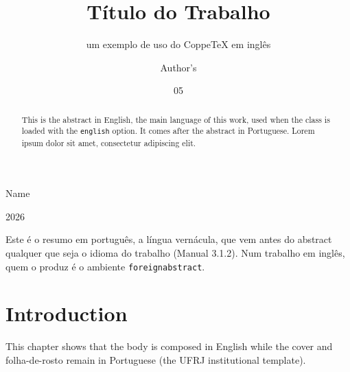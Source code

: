 \documentclass[english,dsc]{ufrj}
\begin{document}
  \title{Título do Trabalho}
  \subtitle{um exemplo de uso do CoppeTeX em inglês}
  \author{Author's}{Name}
  \date{05}{2026}
  \maketitle
  \frontmatter
  \begin{foreignabstract}
    Este é o resumo em português, a língua vernácula, que vem antes do
    abstract qualquer que seja o idioma do trabalho (Manual 3.1.2). Num
    trabalho em inglês, quem o produz é o ambiente \texttt{foreignabstract}.
  \end{foreignabstract}
  \begin{abstract}
    This is the abstract in English, the main language of this work, used
    when the class is loaded with the \texttt{english} option. It comes after
    the abstract in Portuguese. Lorem ipsum dolor sit amet, consectetur
    adipiscing elit.
  \end{abstract}
  \tableofcontents
  \mainmatter
  \chapter{Introduction}
  This chapter shows that the body is composed in English while the
  cover and folha-de-rosto remain in Portuguese (the UFRJ institutional
  template).
\end{document}
